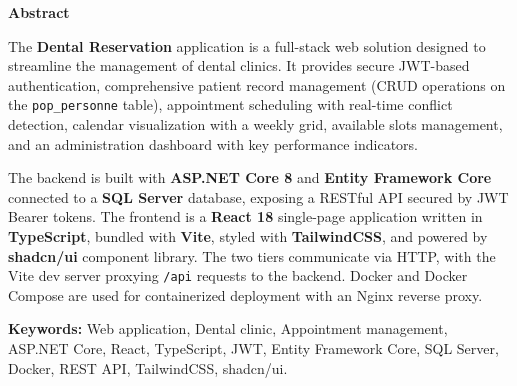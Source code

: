 \clearpage
\thispagestyle{chaptertitlepage}

\vspace*{2cm}

\begin{center}
{\fontsize{24}{29}\selectfont\bfseries Abstract}
\end{center}

\vspace{1.5cm}

{\fontsize{14}{18}\selectfont
The \textbf{Dental Reservation} application is a full-stack web solution designed to streamline the management of dental clinics. It provides secure JWT-based authentication, comprehensive patient record management (CRUD operations on the \texttt{pop\_personne} table), appointment scheduling with real-time conflict detection, calendar visualization with a weekly grid, available slots management, and an administration dashboard with key performance indicators.

The backend is built with \textbf{ASP.NET Core 8} and \textbf{Entity Framework Core} connected to a \textbf{SQL Server} database, exposing a RESTful API secured by JWT Bearer tokens. The frontend is a \textbf{React 18} single-page application written in \textbf{TypeScript}, bundled with \textbf{Vite}, styled with \textbf{TailwindCSS}, and powered by \textbf{shadcn/ui} component library. The two tiers communicate via HTTP, with the Vite dev server proxying \texttt{/api} requests to the backend. Docker and Docker Compose are used for containerized deployment with an Nginx reverse proxy.
}

\vspace{1.5cm}

{\fontsize{14}{18}\selectfont
\textbf{Keywords:} Web application, Dental clinic, Appointment management, ASP.NET Core, React, TypeScript, JWT, Entity Framework Core, SQL Server, Docker, REST API, TailwindCSS, shadcn/ui.
}

\clearpage
